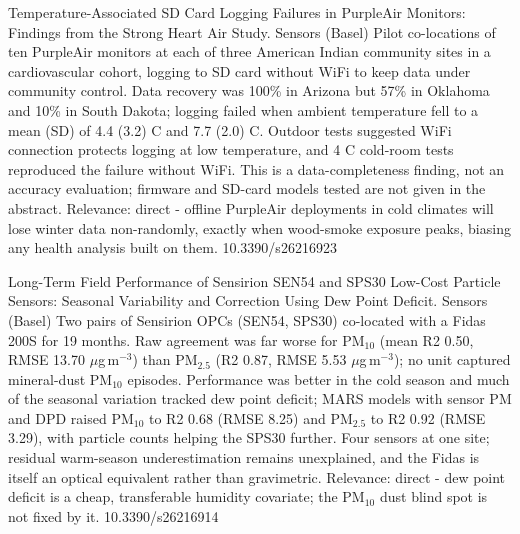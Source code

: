 \documentclass[10pt]{article}
\begin{document}
{Temperature-Associated SD Card Logging Failures in PurpleAir Monitors: Findings from the Strong Heart Air Study.}
{Sensors (Basel)}
{Pilot co-locations of ten PurpleAir monitors at each of three American Indian community sites in a cardiovascular cohort, logging to SD card without WiFi to keep data under community control. Data recovery was 100\% in Arizona but 57\% in Oklahoma and 10\% in South Dakota; logging failed when ambient temperature fell to a mean (SD) of 4.4 (3.2) C and 7.7 (2.0) C. Outdoor tests suggested WiFi connection protects logging at low temperature, and 4 C cold-room tests reproduced the failure without WiFi. This is a data-completeness finding, not an accuracy evaluation; firmware and SD-card models tested are not given in the abstract. Relevance: direct - offline PurpleAir deployments in cold climates will lose winter data non-randomly, exactly when wood-smoke exposure peaks, biasing any health analysis built on them.}
{10.3390/s26216923}

{Long-Term Field Performance of Sensirion SEN54 and SPS30 Low-Cost Particle Sensors: Seasonal Variability and Correction Using Dew Point Deficit.}
{Sensors (Basel)}
{Two pairs of Sensirion OPCs (SEN54, SPS30) co-located with a Fidas 200S for 19 months. Raw agreement was far worse for PM$_{10}$ (mean R2 0.50, RMSE 13.70 $\mu$g\,m$^{-3}$) than PM$_{2.5}$ (R2 0.87, RMSE 5.53 $\mu$g\,m$^{-3}$); no unit captured mineral-dust PM$_{10}$ episodes. Performance was better in the cold season and much of the seasonal variation tracked dew point deficit; MARS models with sensor PM and DPD raised PM$_{10}$ to R2 0.68 (RMSE 8.25) and PM$_{2.5}$ to R2 0.92 (RMSE 3.29), with particle counts helping the SPS30 further. Four sensors at one site; residual warm-season underestimation remains unexplained, and the Fidas is itself an optical equivalent rather than gravimetric. Relevance: direct - dew point deficit is a cheap, transferable humidity covariate; the PM$_{10}$ dust blind spot is not fixed by it.}
{10.3390/s26216914}
\end{document}

